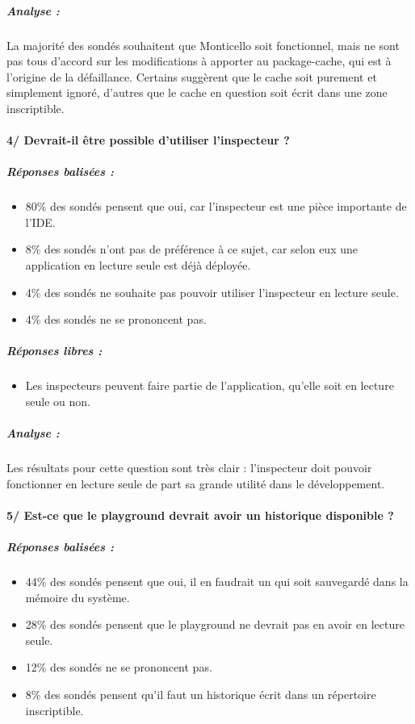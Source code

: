 \subparagraph{Analyse :}
La majorité des sondés souhaitent que Monticello soit fonctionnel, mais ne sont pas tous d'accord sur les modifications à apporter au package-cache, qui est à l'origine de la défaillance. Certains suggèrent que le cache soit purement et simplement ignoré, d'autres que le cache en question soit écrit dans une zone inscriptible.

\paragraph{4/ Devrait-il être possible d'utiliser l'inspecteur ?}
\subparagraph{Réponses balisées :}
\begin{itemize}
	\item 80\% des sondés pensent que oui, car l'inspecteur est une pièce importante de l'IDE.
	\item 8\% des sondés n'ont pas de préférence à ce sujet, car selon eux une application en lecture seule est déjà déployée.
	\item 4\% des sondés ne souhaite pas pouvoir utiliser l'inspecteur en lecture seule.
	\item 4\% des sondés ne se prononcent pas.
\end{itemize}

\subparagraph{Réponses libres :}
\begin{itemize}
	\item Les inspecteurs peuvent faire partie de l'application, qu'elle soit en lecture seule ou non.
\end{itemize}

\subparagraph{Analyse :}
Les résultats pour cette question sont très clair : l'inspecteur doit pouvoir fonctionner en lecture seule de part sa grande utilité dans le développement.

\paragraph{5/ Est-ce que le playground devrait avoir un historique disponible ?}
\subparagraph{Réponses balisées :}
\begin{itemize}
	\item 44\% des sondés pensent que oui, il en faudrait un qui soit sauvegardé dans la mémoire du système.
	\item 28\% des sondés pensent que le playground ne devrait pas en avoir en lecture seule.
	\item 12\% des sondés ne se prononcent pas.
	\item 8\% des sondés pensent qu'il faut un historique écrit dans un répertoire inscriptible.
\end{itemize}

